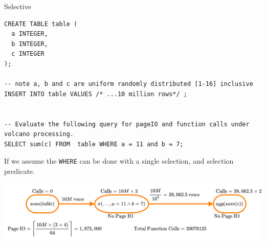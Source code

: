 \begin{examplebox}{Selective}
  \begin{verbatim}
CREATE TABLE table (
  a INTEGER,
  b INTEGER,
  c INTEGER
);

-- note a, b and c are uniform randomly distributed [1-16] inclusive 
INSERT INTO table VALUES /* ...10 million rows*/ ;


-- Evaluate the following query for pageIO and function calls under volcano processing.
SELECT sum(c) FROM  table WHERE a = 11 and b = 7;
  \end{verbatim}
  \tcblower
  If we assume the \texttt{WHERE} can be done with a single selection, and selection predicate. 
  \begin{center}
    \includegraphics[width=\textwidth]{processing_models/images/example_basic_selection.drawio.png}
  \end{center}
\end{examplebox}

